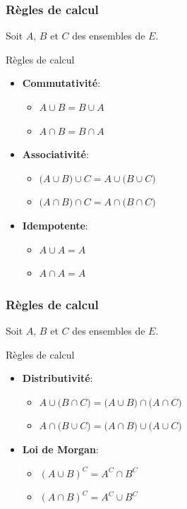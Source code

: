 \documentclass{beamer}
\begin{document}
\begin{frame}[<+->]
  \frametitle{Règles de calcul}
   Soit $A$, $B$ et $C$ des ensembles de $E$. 
 \begin{block}{Règles de calcul}
   \small
   \begin{itemize}
     \item \textbf{\alert{Commutativité}}: 
       \begin{itemize}
         \item $ A\cup B = B\cup A$
         \item $ A \cap B = B \cap A$
       \end{itemize}

     \item \textbf{\alert{Associativité}}: 
       \begin{itemize}
         \item $ \big(A\cup B\big) \cup C = A \cup \big( B \cup C\big)$
         \item $ \big(A\cap B\big) \cap C = A \cap \big( B \cap C\big)$
       \end{itemize}

     \item \textbf{\alert{Idempotente}}: 
       \begin{itemize}
         \item $ A \cup A = A$
         \item $ A \cap A = A$
       \end{itemize}
   \end{itemize}
 \end{block} 
\end{frame}
\begin{frame}[<+->]
  \frametitle{Règles de calcul}
   Soit $A$, $B$ et $C$ des ensembles de $E$. 
   \begin{block}{Règles de calcul}
     \begin{itemize}
       \item \textbf{\alert{Distributivité}}:

         \begin{itemize}
           \item $A\cup\big( B \cap C\big) = \big( A \cup B\big) \cap \big( A
             \cap C\big)$
           \item $A\cap\big(B \cup C\big) = \big(A \cap B\big) \cup \big( A
             \cup C\big)$
         \end{itemize}

       \item \textbf{\alert{Loi de Morgan}}:
         \begin{itemize}
           \item $(A \cup B)^C = A^C \cap B^C$
           \item $(A \cap B)^C = A^C \cup B^C$
         \end{itemize}
     \end{itemize} 
   \end{block}
\end{frame}
\end{document}
